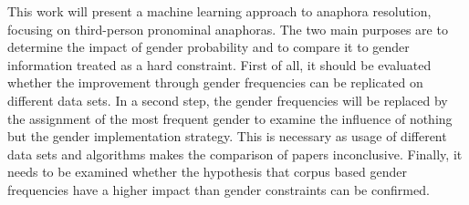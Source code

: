 This work will present a machine learning approach to anaphora resolution, focusing on third-person pronominal anaphoras. The two main purposes are to determine the impact of gender probability and to compare it to gender information treated as a hard constraint. First of all, it should be evaluated whether the improvement through gender frequencies can be replicated on different data sets. In a second step, the gender frequencies will be replaced by the assignment of the most frequent gender to examine the influence of nothing but the gender implementation strategy. This is necessary as usage of different data sets and algorithms makes the comparison of papers inconclusive. Finally, it needs to be examined whether the hypothesis that corpus based gender frequencies have a higher impact than gender constraints can be confirmed.

